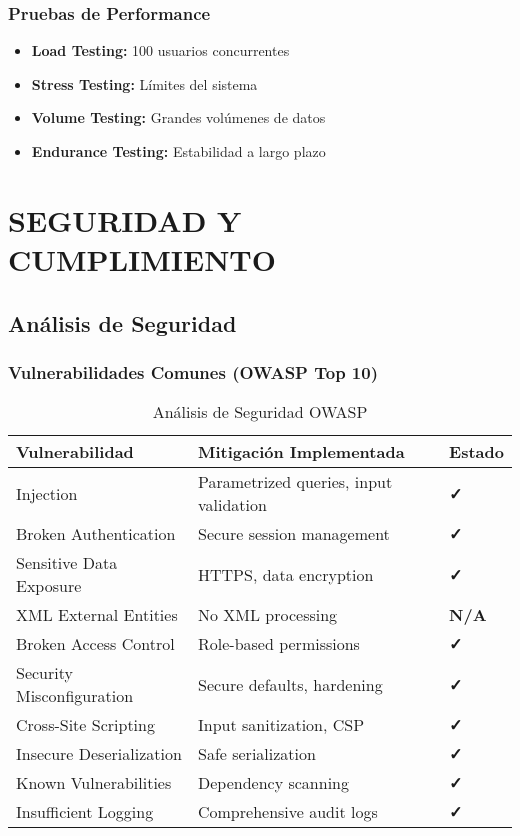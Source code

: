 \documentclass[12pt,a4paper]{article}
\begin{document}
\subsubsection{Pruebas de Performance}

\begin{itemize}
    \item \textbf{Load Testing:} 100 usuarios concurrentes
    \item \textbf{Stress Testing:} Límites del sistema
    \item \textbf{Volume Testing:} Grandes volúmenes de datos
    \item \textbf{Endurance Testing:} Estabilidad a largo plazo
\end{itemize}

\section{SEGURIDAD Y CUMPLIMIENTO}

\subsection{Análisis de Seguridad}

\subsubsection{Vulnerabilidades Comunes (OWASP Top 10)}

\begin{table}[h]
\centering
\begin{tabularx}{\textwidth}{|l|X|l|}
\hline
\textbf{Vulnerabilidad} & \textbf{Mitigación Implementada} & \textbf{Estado} \\
\hline
Injection & Parametrized queries, input validation & \textcolor{epngreen}{\textbf{✓}} \\
\hline
Broken Authentication & Secure session management & \textcolor{epngreen}{\textbf{✓}} \\
\hline
Sensitive Data Exposure & HTTPS, data encryption & \textcolor{epngreen}{\textbf{✓}} \\
\hline
XML External Entities & No XML processing & \textcolor{epngreen}{\textbf{N/A}} \\
\hline
Broken Access Control & Role-based permissions & \textcolor{epngreen}{\textbf{✓}} \\
\hline
Security Misconfiguration & Secure defaults, hardening & \textcolor{epngreen}{\textbf{✓}} \\
\hline
Cross-Site Scripting & Input sanitization, CSP & \textcolor{epngreen}{\textbf{✓}} \\
\hline
Insecure Deserialization & Safe serialization & \textcolor{epngreen}{\textbf{✓}} \\
\hline
Known Vulnerabilities & Dependency scanning & \textcolor{epngreen}{\textbf{✓}} \\
\hline
Insufficient Logging & Comprehensive audit logs & \textcolor{epngreen}{\textbf{✓}} \\
\hline
\end{tabularx}
\caption{Análisis de Seguridad OWASP}
\end{table}
\end{document}
